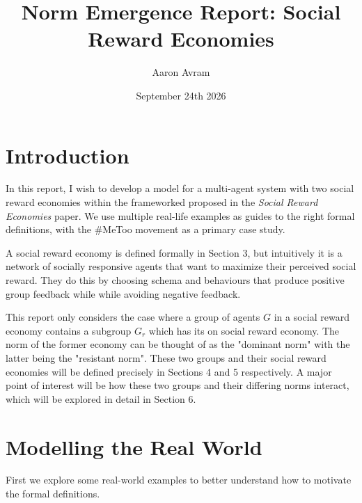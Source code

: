 \documentclass[12pt]{article}
\title{Norm Emergence Report: Social Reward Economies}
\author{Aaron Avram}
\date{September 24th 2026}
\begin{document}
\theoremstyle{plain}
\newtheorem{theorem}{Theorem}
\newtheorem{proposition}{Proposition}
\newtheorem{lemma}[theorem]{Lemma}
\newtheorem{corollary}[theorem]{Corollary}
\newtheorem{claim}[theorem]{Claim}

\theoremstyle{definition}
\newtheorem{definition}{Definition}
\newtheorem{example}{Example}
\newtheorem{exercise}[theorem]{Exercise}

\theoremstyle{remark}
\newtheorem{remark}[theorem]{Remark}
\newtheorem{note}[theorem]{Note}

\maketitle

\section{Introduction}
In this report, I wish to develop a model for a multi-agent system with two social reward economies
within the frameworked proposed in the \textit{Social Reward Economies} paper. We use multiple real-life
examples as guides to the right formal definitions, with the \#MeToo movement as a primary case study.

A social reward economy is defined formally in Section 3, but intuitively
it is a network of socially responsive agents that want to maximize their perceived social reward.
They do this by choosing schema and behaviours that produce positive group feedback while while avoiding
negative feedback.

This report only considers the case where a group of agents $G$ in a social reward economy contains a subgroup $G_r$
which has its on social reward economy. The norm of the former economy can be thought of as the "dominant norm"
with the latter being the "resistant norm". These two groups and their social reward economies will be defined
precisely in Sections 4 and 5 respectively. A major point of interest will be how these two groups
and their differing norms interact, which will be explored in detail in Section 6.

\section{Modelling the Real World}
First we explore some real-world examples to better understand
how to motivate the formal definitions.
\end{document}
